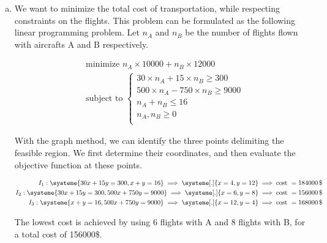 \documentclass[a4paper, 10pt, twoside]{article}
\begin{document}
\begin{enumerate}[a)]
    \item We want to minimize the total cost of transportation, while respecting constraints on the flights. This problem can be formulated as the following linear programming problem.
          Let $n_{A}$ and $n_{B}$ be the number of flights flown with aircrafts A and B respectively.

          \begin{align*}
               & \text{minimize } n_{A} \times 10000 + n_{B} \times 12000 \\
               & \text{subject to }
              \begin{cases}
                  30 \times n_{A} + 15 \times n_{B} \ge 300    \\
                  500 \times n_{A} - 750 \times n_{B} \ge 9000 \\
                  n_{A} + n_{B} \le 16                         \\
                  n_{A}, n_{B} \ge 0                           \\
              \end{cases}
          \end{align*}

          With the graph method, we can identify the three points delimiting the feasible region. We first determine their coordinates, and then evaluate the objective function at these points.

          \begin{align*}
              I_1 :
              \systeme{
                  30x+15y=300,
                  x+y=16
              }
              \implies
              \systeme[.]{
                  x=4,
                  y=12
              }
              \implies \text{cost } = 184000\,\$ \\
              I_2 :
              \systeme{
                  30x+15y=300,
                  500x+750y=9000
              }
              \implies
              \systeme[.]{
                  x=6,
                  y=8
              }
              \implies \text{cost } = 156000\,\$ \\
              I_3 :
              \systeme{
                  x+y=16,
                  500x+750y=9000
              }
              \implies
              \systeme[.]{
                  x=12,
                  y=4
              }
              \implies \text{cost } = 168000\,\$ \\
          \end{align*}

          The lowest cost is achieved by using 6 flights with A and 8 flights with B, for a total cost of 156000\$.

\end{enumerate}
\end{document}
